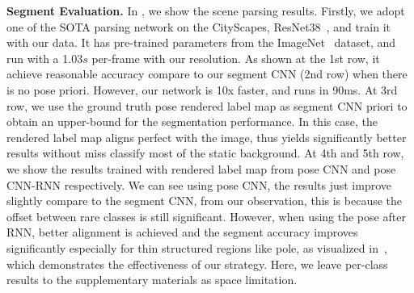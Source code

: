 \textbf{Segment Evaluation.}
In , we show the scene parsing results. 
Firstly, we adopt one of the SOTA parsing network on the CityScapes, \ie ResNet38~\cite{WuSH16e}, and train it with our data. It has pre-trained parameters from the ImageNet~\cite{deng2009imagenet} dataset, and run with a 1.03$s$ per-frame with our resolution. As shown at the 1st row, it achieve reasonable accuracy compare to our segment CNN (2nd row) when there is no pose priori. 
However, our network is 10x faster, and runs in 90ms. 
At 3rd row, we use the ground truth pose rendered label map as segment CNN priori to obtain an upper-bound for the segmentation performance. 
In this case, the rendered label map aligns perfect with the image, thus yields significantly better results without miss classify most of the static background.
At 4th and 5th row, we show the results trained with rendered label map from pose CNN and pose CNN-RNN respectively. We can see using pose CNN, the results just improve slightly compare to the segment CNN, from our observation, this is because the offset between rare classes is still significant.
However, when using the pose after RNN, better alignment is achieved and the segment accuracy improves significantly especially for thin structured regions like pole, as visualized in~, which demonstrates the effectiveness of our strategy. 
Here, we leave per-class results to the supplementary materials as space limitation.


